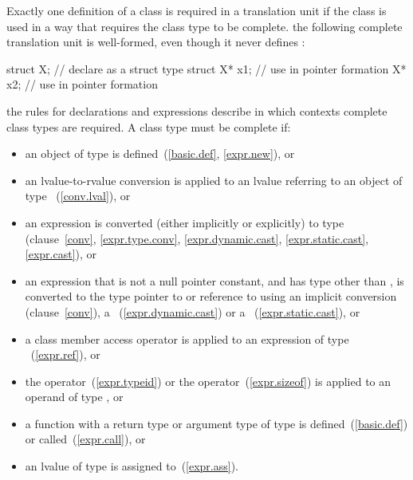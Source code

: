 \pnum
{}%
Exactly one definition of a class is required in a translation unit if
the class is used in a way that requires the class type to be complete.
\enterexample the following complete translation unit is well-formed,
even though it never defines :

\begin{codeblock}
struct X;                       // declare  as a struct type
struct X* x1;                   // use  in pointer formation
X* x2;                          // use  in pointer formation
\end{codeblock}
\exitexampleb
\enternote the rules for declarations and expressions
describe in which contexts complete class types are required. A class
type  must be complete if:

\begin{itemize}
\item an object of type  is defined~(\ref{basic.def}, \ref{expr.new}), or
\item an lvalue-to-rvalue conversion is applied to an lvalue referring
to an object of type ~(\ref{conv.lval}), or
\item an expression is converted (either implicitly or explicitly) to
type  (clause~\ref{conv}, \ref{expr.type.conv},
\ref{expr.dynamic.cast}, \ref{expr.static.cast}, \ref{expr.cast}), or
\item an expression that is not a null pointer constant, and has type
other than , is converted to the type pointer to 
or reference to  using an implicit conversion
(clause~\ref{conv}), a ~(\ref{expr.dynamic.cast}) or
a ~(\ref{expr.static.cast}), or
\item a class member access operator is applied to an expression of type
~(\ref{expr.ref}), or
\item the  operator~(\ref{expr.typeid}) or the
 operator~(\ref{expr.sizeof}) is applied to an operand of
type , or
\item a function with a return type or argument type of type 
is defined~(\ref{basic.def}) or called~(\ref{expr.call}), or
\item an lvalue of type  is assigned to~(\ref{expr.ass}).
\exitnote 
\end{itemize}

